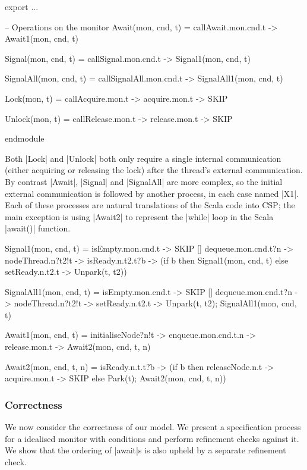 \begin{cspm}
export 
  ...

  -- Operations on the monitor
  Await(mon, cnd, t) = callAwait.mon.cnd.t -> Await1(mon, cnd, t)

  Signal(mon, cnd, t) = callSignal.mon.cnd.t -> Signal1(mon, cnd, t)

  SignalAll(mon, cnd, t) = callSignalAll.mon.cnd.t -> SignalAll1(mon, cnd, t)

  Lock(mon, t) = callAcquire.mon.t -> acquire.mon.t -> SKIP

  Unlock(mon, t) = callRelease.mon.t -> release.mon.t -> SKIP

 endmodule
\end{cspm}

Both |Lock| and |Unlock| both only require a single internal communication (either acquiring or releasing the lock) after the thread's external communication. By contrast |Await|, |Signal| and |SignalAll| are more complex, so the initial external communication is followed by another process, in each case named |X1|. Each of these processes are natural translations of the Scala code into CSP; the main exception is using |Await2| to represent the |while| loop in the Scala |await()| function.

\begin{cspm}
Signal1(mon, cnd, t) = 
      isEmpty.mon.cnd.t -> SKIP
  [] dequeue.mon.cnd.t?n -> nodeThread.n?t2!t -> isReady.n.t2.t?b ->
        (if b then Signal1(mon, cnd, t)
        else setReady.n.t2.t -> Unpark(t, t2))

SignalAll1(mon, cnd, t) =
      isEmpty.mon.cnd.t -> SKIP
  [] dequeue.mon.cnd.t?n -> nodeThread.n?t2!t -> setReady.n.t2.t -> 
          Unpark(t, t2); SignalAll1(mon, cnd, t)

Await1(mon, cnd, t) = 
  initialiseNode?n!t -> enqueue.mon.cnd.t.n -> release.mon.t -> Await2(mon, cnd, t, n)

Await2(mon, cnd, t, n) = 
  isReady.n.t.t?b -> (if b then releaseNode.n.t -> acquire.mon.t -> SKIP
                      else Park(t); Await2(mon, cnd, t, n))
\end{cspm}



\subsubsection{Correctness}

We now consider the correctness of our model. We present a specification process for a idealised monitor with conditions and perform refinement checks against it. We show that the ordering of |await|s is also upheld by a separate refinement check.
  
